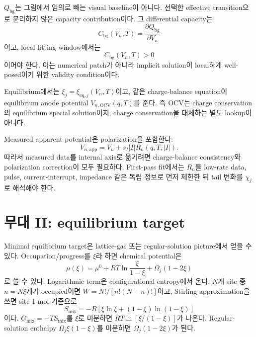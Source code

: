 \documentclass[11pt,a4paper]{article}
\newcommand{\eq}{\mathrm{eq}}
\newcommand{\app}{\mathrm{app}}
\newcommand{\bg}{\mathrm{bg}}
\newcommand{\OCV}{\mathrm{OCV}}
\begin{document}
$Q_{\bg}$는 그림에서 임의로 빼는 visual baseline이 아니다. 선택한 effective transition으로 분리하지 않은 capacity contribution이다.
그 differential capacity는
\begin{equation}
C_{\bg}(V_n,T)=\frac{\partial Q_{\bg}}{\partial V_n}
\label{eq:Cbg}
\end{equation}
이고, local fitting window에서는
\begin{equation}
C_{\bg}(V_n,T)>0
\label{eq:monotone}
\end{equation}
이어야 한다. 이는 numerical patch가 아니라 implicit solution이 local하게 well-posed이기 위한 validity condition이다.

Equilibrium에서는 $\xi_j=\xi_{\eq,j}(V_n,T)$이고, 같은 charge-balance equation이 equilibrium anode potential
$V_{n,\OCV}(q,T)$를 준다. 즉 OCV는 charge conservation의 equilibrium special solution이지, charge conservation을 대체하는
별도 lookup이 아니다.

Measured apparent potential은 polarization을 포함한다:
\begin{equation}
V_{n,\app}=V_n+s_I|I|R_n(q,T,|I|).
\label{eq:Vapp}
\end{equation}
따라서 measured data를 internal axis로 옮기려면 charge-balance consistency와 polarization correction이 모두 필요하다.
First-pass fit에서는 $R_n$을 low-rate data, pulse, current-interrupt, impedance 같은 독립 정보로 먼저 제한한 뒤 tail 변화를
$\chi_j$로 해석해야 한다.

\section{무대 II: equilibrium target}\label{sec:eq}
Minimal equilibrium target은 lattice-gas 또는 regular-solution picture에서 얻을 수 있다. Occupation/progress를 $\xi$라 하면
chemical potential은
\begin{equation}
\mu(\xi)=\mu^0+RT\ln\frac{\xi}{1-\xi}+\Omega_j(1-2\xi)
\label{eq:mu_latticegas}
\end{equation}
로 쓸 수 있다. Logarithmic term은 configurational entropy에서 온다. $N$개 site 중 $n=N\xi$개가 occupied이면
$W=N!/[n!(N-n)!]$이고, Stirling approximation을 쓰면 site 1 mol 기준으로
\begin{equation}
S_{\mathrm{mix}}=-R[\xi\ln\xi+(1-\xi)\ln(1-\xi)]
\end{equation}
이다. $G_{\mathrm{mix}}=-TS_{\mathrm{mix}}$를 $\xi$로 미분하면 $RT\ln[\xi/(1-\xi)]$가 나온다. Regular-solution enthalpy
$\Omega_j\xi(1-\xi)$를 미분하면 $\Omega_j(1-2\xi)$가 된다.
\end{document}
